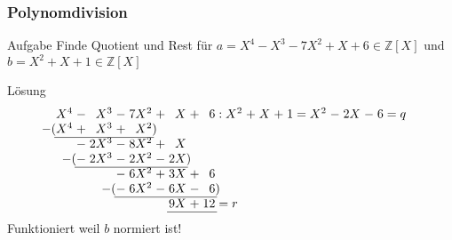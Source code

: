 %
%
%
\begin{frame}[t]
\frametitle{Polynomdivision}
\begin{block}{Aufgabe}
Finde Quotient und Rest für
$a= X^4- X^3-7X^2+ X+6\in\mathbb{Z}[X]$
und
$b= X^2+X+1\in\mathbb{Z}[X]$
\end{block}
\begin{block}{Lösung}
\[
\arraycolsep=1.4pt
\begin{array}{rcrcrcrcrcrcrcrcrcrcr}
X^4&-& X^3&-&7X^2&+& X&+&6&:&X^2&+&X&+&1&=&X^2&-&2X&-&6=q\\
\llap{$-($}X^4&+& X^3&+& X^2\rlap{$)$}& &  & & & &   & & & & & &   & &  & & \\ \cline{1-5}
   &-&2X^3&-&8X^2&+& X& & & &   & & & & & &   & &  & & \\
   &\llap{$-($}-&2X^3&-&2X^2&-&2X\rlap{$)$}& & & &   & & & & & &   & &  & & \\ \cline{2-7}
   & &    &-&6X^2&+&3X&+&6& &   & & & & & &   & &  & & \\
   & &    &\llap{$-($}-&6X^2&-&6X&-&6\rlap{$)$}& &   & & & & & &   & &  & & \\ \cline{4-9}
   & &    & &    & &9X&+&12\rlap{$\mathstrut=r$}& &   & & & & & &   & &  & & \\ \cline{7-9}
\end{array}
\]
Funktioniert weil $b$ normiert ist!
\end{block}
\end{frame}
